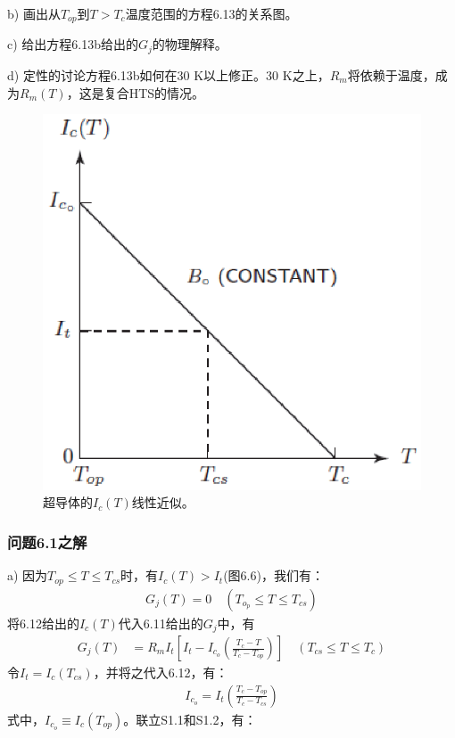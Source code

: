 b) 画出从$T_{op}$到$T>T_c$温度范围的方程6.13的关系图。

c) 给出方程6.13b给出的$G_j$的物理解释。

d) 定性的讨论方程6.13b如何在30 K以上修正。30 K之上，$R_m$将依赖于温度，成为$R_m(T)$，这是复合HTS的情况。

\begin{figure}[htbp]
	\centering
	\includegraphics[scale=0.6]{chpt6/figs/fig6.6.eps}
	\caption{超导体的$I_c(T)$线性近似。}
\end{figure}

\subsubsection{问题6.1之解}
a) 因为$T_{op}\le T\le T_{cs}$时，有$I_c(T)>I_t$(图6.6)，我们有：
\begin{align*}
G_j(T)=0 \quad (T_{o_p}\leq T \leq T_{cs}) \tag{6.13a}
\end{align*}
将6.12给出的$I_c(T)$代入6.11给出的$G_j$中，有
\begin{align*}
G_j(T)&=R_m I_t[I_t-I_{c_o} \left(\frac{T_c-T}{T_c-T_{op}}\right)]\quad (T_{cs}\leq T\leq T_c) \tag{S1.1}
\end{align*}
令$I_t=I_c(T_{cs})$，并将之代入6.12，有：
\begin{align*}%
I_{c_o}=I_t\left(\frac{T_c-T_{op} }{T_c-T_{cs}}\right) \tag{S1.2}
\end{align*}
式中，$I_{c_o}\equiv I_c(T_{op})$。联立S1.1和S1.2，有：

